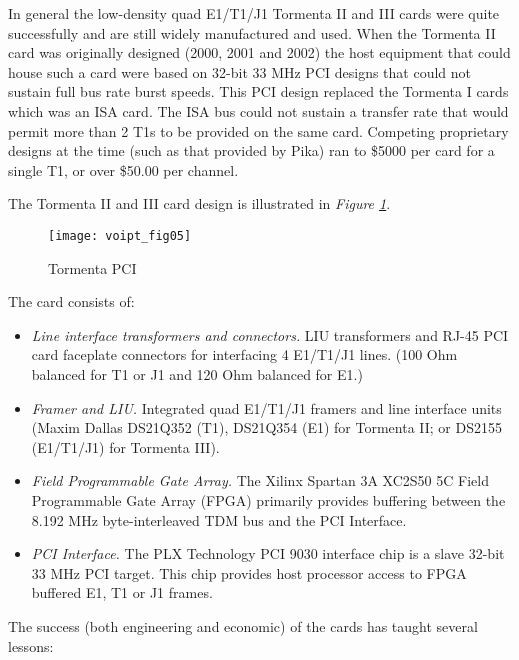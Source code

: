 \documentclass[letterpaper,final,notitlepage,twocolumn,10pt,twoside]{article}
\begin{document}
In general the low-density quad E1/T1/J1 Tormenta II and III cards were quite
successfully and are still widely manufactured and used.  When the Tormenta II
card was originally designed (2000, 2001 and 2002) the host equipment that could
house such a card were based on 32-bit 33 MHz PCI designs that could not sustain
full bus rate burst speeds.  This PCI design replaced the Tormenta I cards which
was an ISA card.  The ISA bus could not sustain a transfer rate that would
permit more than 2 T1s to be provided on the same card.  Competing proprietary
designs at the time (such as that provided by Pika) ran to \$5000 per card for a
single T1, or over \$50.00 per channel.

The Tormenta II and III card design is illustrated in \textsl{Figure
\ref{figure:voipt_fig05}}.
\begin{figure}[htp]
\center\texttt{[image: voipt\_fig05]}
\caption[Tormenta]{Tormenta PCI}
\label{figure:voipt_fig05}
\end{figure}
The card consists of:

\begin{itemize}
	\item \textsl{Line interface transformers and connectors.}
		LIU transformers and RJ-45 PCI card faceplate connectors for
		interfacing 4 E1/T1/J1 lines. (100 Ohm balanced for T1 or J1 and
		120 Ohm balanced for E1.)
	\item \textsl{Framer and LIU.}
		Integrated quad E1/T1/J1 framers and line interface units
		(Maxim Dallas DS21Q352 (T1), DS21Q354 (E1) for Tormenta II; or
		DS2155 (E1/T1/J1) for Tormenta III).
	\item \textsl{Field Programmable Gate Array.}
		The Xilinx Spartan 3A XC2S50 5C Field Programmable Gate Array
		(FPGA) primarily provides buffering between the 8.192 MHz
		byte-interleaved TDM bus and the PCI Interface.
	\item \textsl{PCI Interface.}
		The PLX Technology PCI 9030 interface chip is a slave 32-bit 33
		MHz PCI target.  This chip provides host processor access to FPGA buffered E1, T1 or
		J1 frames.
\end{itemize}

The success (both engineering and economic) of the cards has taught several
lessons:
\end{document}
